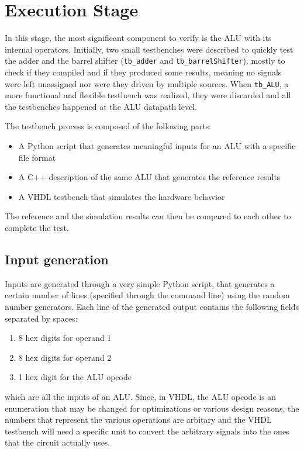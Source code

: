 \section{Execution Stage}
In this stage, the most significant component to verify is the ALU with its internal operators. Initially,
two small testbenches were described to quickly test the adder and the barrel shifter (\texttt{tb\_adder} and
\texttt{tb\_barrelShifter}), mostly to check if they compiled and if they produced some results, meaning no signals
were left unassigned nor were they driven by multiple sources. When \texttt{tb\_ALU}, a more functional and flexible
testbench was realized, they were discarded and all the testbenches happened at the ALU datapath level.

The testbench process is composed of the following parts:
\begin{itemize}
    \item A Python script that generates meaningful inputs for an ALU with a specific file format
    \item A C++ description of the same ALU that generates the reference results
    \item A VHDL testbench that simulates the hardware behavior
\end{itemize}
The reference and the simulation results can then be compared to each other to complete the test.

\subsection{Input generation}
\label{sec:tb-input-gen}
Inputs are generated through a very simple Python script, that generates a certain number of lines (specified through
the command line) using the random number generators. Each line of the
generated output contains the following fields separated by spaces:
\begin{enumerate}
    \item 8 hex digits for operand 1
    \item 8 hex digits for operand 2
    \item 1 hex digit for the ALU opcode
\end{enumerate}
which are all the inputs of an ALU. Since, in VHDL, the ALU opcode is an enumeration that may be changed for
optimizations or various design reasons, the numbers that represent the various operations are arbitary and the
VHDL testbench will need a specific unit to convert the arbitrary signals into the ones that the circuit actually uses.

